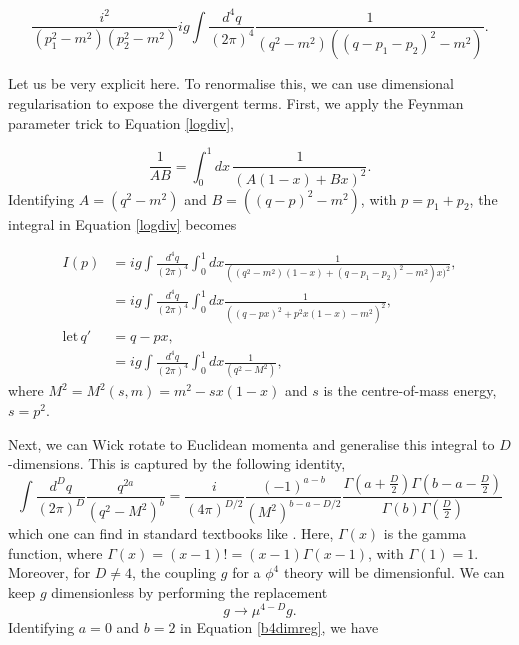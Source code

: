 \documentclass{article}
\begin{document}
\begin{equation}
    \frac{i^2}{(p_1^2-m^2)(p_2^2-m^2)}ig\int \frac{d^4q}{(2\pi)^4} \frac{1}{(q^2-m^2)((q-p_1-p_2)^2 - m^2)}.
    \label{logdiv}
\end{equation}

Let us be very explicit here. To renormalise this, we can use dimensional regularisation to expose the divergent terms. First, we apply the Feynman parameter trick to Equation \ref{logdiv},

\begin{equation}
    \frac{1}{AB} = \int_0^1 dx \, \frac{1}{(A(1-x) + Bx)^2}.
\label{Feynparam trick}
\end{equation}
Identifying $A=(q^2-m^2)$ and $B=((q-p)^2-m^2)$, with $p=p_1+p_2$, the integral in Equation \ref{logdiv} becomes

\begin{equation}
\begin{split}
    I(p) &= ig\int \frac{d^4q}{(2\pi)^4}\int^1_0 dx \frac{1}{((q^2-m^2)(1-x) +(q-p_1-p_2)^2 - m^2)x)^2},\\
    &= ig\int \frac{d^4q}{(2\pi)^4}\int^1_0 dx \frac{1}{((q-px)^2 + p^2x(1-x) - m^2 )^2},\\
    \mathrm{let}\, q'&= q-px,\\
    &= ig\int \frac{d^4q}{(2\pi)^4}\int^1_0 dx \frac{1}{(q^2 -M^2)},
    \label{b4dimreg}
\end{split}
\end{equation}
where $M^2=M^2(s,m)=m^2-sx(1-x)$ and $s$ is the centre-of-mass energy, $s=p^2$.

Next, we can Wick rotate to Euclidean momenta and generalise this integral to $D$-dimensions. This is captured by the following identity, 
\begin{equation}
    \int\frac{d^Dq}{(2\pi)^D} \frac{q^{2a}}{(q^2-M^2)^b}=\frac{i}{(4\pi)^{D/2}}\frac{(-1)^{a-b}}{(M^2)^{b-a-D/2}} \frac{\Gamma(a+\frac{D}{2})\Gamma(b-a-\frac{D}{2})}{\Gamma(b)\Gamma(\frac{D}{2})}
\end{equation}
which one can find in standard textbooks like \cite{schwartz}. Here, $\Gamma(x)$ is the gamma function, where $\Gamma(x) = (x-1)! = (x-1)\Gamma(x-1)$, with $\Gamma(1)=1$. Moreover, for $D\neq 4$, the coupling $g$ for a $\phi^4$ theory will be dimensionful. We can keep $g$ dimensionless by performing the replacement
\begin{equation}
    g \rightarrow \mu^{4-D}g.
\end{equation}
Identifying $a=0$ and $b=2$ in Equation \ref{b4dimreg}, we have 
\end{document}
